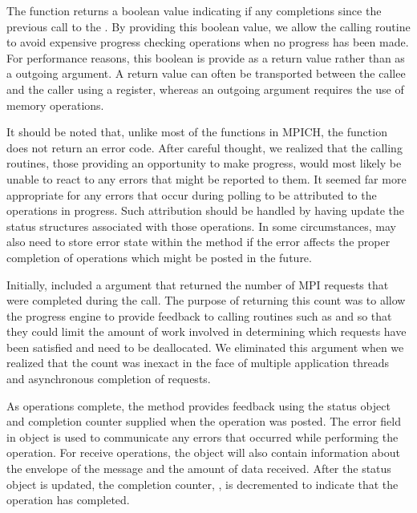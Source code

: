The  function returns a boolean value indicating if any
completions since the previous call to the .  By providing
this boolean value, we allow the calling routine to avoid expensive progress
checking operations when no progress has been made.  For performance reasons,
this boolean is provide as a return value rather than as a outgoing argument.
A return value can often be transported between the callee and the caller using
a register, whereas an outgoing argument requires the use of memory operations.

It should be noted that, unlike most of the functions in MPICH, the
 function does not return an error code.  After careful
thought, we realized that the calling routines, those providing an opportunity
to make progress, would most likely be unable to react to any errors that might
be reported to them.  It seemed far more appropriate for any errors that occur
during polling to be attributed to the operations in progress.  Such
attribution should be handled by having  update the status
structures associated with those operations.  In some circumstances,
 may also need to store error state within the method if the
error affects the proper completion of operations which might be posted in the
future.

\begin{discussion}
Initially,  included a  argument that returned the
number of MPI requests that were completed during the call.  The purpose of
returning this count was to allow the progress engine to provide feedback to
calling routines such as  and  so that they could
limit the amount of work involved in determining which requests have been
satisfied and need to be deallocated.  We eliminated this argument when we
realized that the count was inexact in the face of multiple application threads
and asynchronous completion of requests.
\end{discussion}

As operations complete, the method provides feedback using the status object
and completion counter supplied when the operation was posted.  The error field
in  object is used to communicate any errors that occurred while
performing the operation.  For receive operations, the  object
will also contain information about the envelope of the message and the amount
of data received.  After the status object is updated, the completion counter,
, is decremented to indicate that the operation has
completed.

